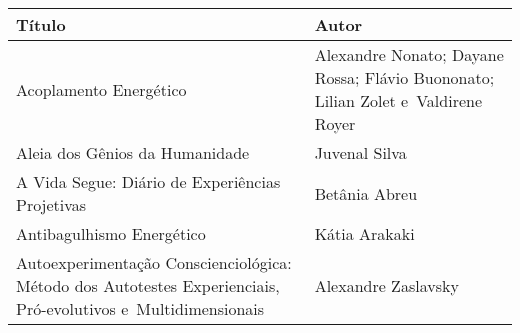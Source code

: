 \documentclass{gescons}
\begin{document}
\begin{longtable}[]{@{}
  >{\raggedright\arraybackslash}p{}
  >{\raggedright\arraybackslash}p{}@{}}
\toprule\noalign{}
\begin{minipage}[b]{\linewidth}\centering
\textbf{Título}
\end{minipage} & \begin{minipage}[b]{\linewidth}\centering
\textbf{Autor}
\end{minipage} \\
\hline
\begin{minipage}[b]{\linewidth}\raggedright
Acoplamento Energético
\end{minipage} & \begin{minipage}[b]{\linewidth}\raggedright\addlinespace[2pt]
Alexandre Nonato; Dayane Rossa; Flávio Buononato; Lilian Zolet e~Valdirene Royer
\end{minipage} \\
\hline
\begin{minipage}[b]{\linewidth}\raggedright
Aleia dos Gênios da Humanidade
\end{minipage} & \begin{minipage}[b]{\linewidth}\raggedright
Juvenal Silva
\end{minipage} \\
\hline
\begin{minipage}[b]{\linewidth}\raggedright
A Vida Segue: Diário de Experiências Projetivas
\end{minipage} & \begin{minipage}[b]{\linewidth}\raggedright
Betânia Abreu
\end{minipage} \\
\hline
\begin{minipage}[b]{\linewidth}\raggedright
Antibagulhismo Energético
\end{minipage} & \begin{minipage}[b]{\linewidth}\raggedright
Kátia Arakaki
\end{minipage} \\
\hline
\begin{minipage}[b]{\linewidth}\raggedright\addlinespace[2pt]
Autoexperimentação Conscienciológica: Método dos Autotestes Experienciais, Pró-evolutivos e~Multidimensionais
\end{minipage} & \begin{minipage}[b]{\linewidth}\raggedright
Alexandre Zaslavsky
\end{minipage} \\

\end{longtable}
\end{document}
